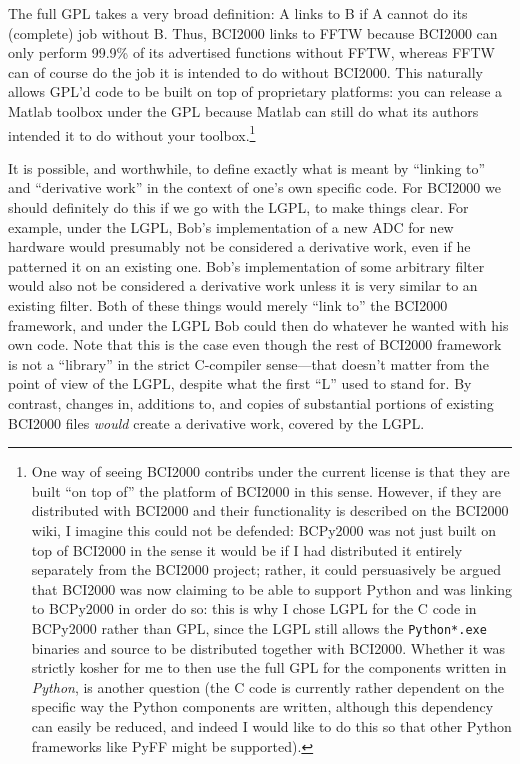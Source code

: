 \documentclass{article}
\begin{document}
The full GPL takes a very broad definition:  A links to B if A cannot do its (complete) job without B.  Thus, BCI2000 links to FFTW because BCI2000 can only perform 99.9\% of its advertised functions without FFTW, whereas FFTW can of course do the job it is intended to do without BCI2000. This naturally allows GPL'd code to be built on top of proprietary platforms: you can release a Matlab toolbox under the GPL because Matlab can still do what its authors intended it to do without your toolbox.\footnote{One way of seeing BCI2000 contribs under the current license is that they are built ``on top of'' the platform of BCI2000 in this sense. However, if they are distributed with BCI2000 and their functionality is described on the BCI2000 wiki, I imagine this could not be defended:  BCPy2000 was not just built on top of BCI2000 in the sense it would be if I had distributed it entirely separately from the BCI2000 project;  rather, it could persuasively be argued that BCI2000 was now claiming to be able to support Python and was linking to BCPy2000 in order do so:  this is why I chose LGPL for the C code in BCPy2000 rather than GPL, since the LGPL still allows the {\tt Python*.exe} binaries and source to be distributed together with BCI2000.  Whether it was strictly kosher for me to then use the full GPL for the components written in {\em Python}, is another question (the C code is currently rather dependent on the specific way the Python components are written, although this dependency can easily be reduced, and indeed I would like to do this so that other Python frameworks like PyFF might be supported).}

It is possible, and worthwhile, to define exactly what is meant by ``linking to'' and ``derivative work'' in the context of one's own specific code.  For BCI2000 we should definitely do this if we go with the LGPL, to make things clear.  For example, under the LGPL, Bob's implementation of a new ADC for new hardware would presumably not be considered a derivative work, even if he patterned it on an existing one.  Bob's implementation of some arbitrary filter would also not be considered a derivative work unless it is very similar to an existing filter.  Both of these things would merely ``link to'' the BCI2000 framework, and under the LGPL Bob could then do whatever he wanted with his own code. Note that this is the case even though the rest of BCI2000 framework is not a ``library'' in the strict C-compiler sense---that doesn't matter from the point of view of the LGPL, despite what the first ``L'' used to stand for.  By contrast, changes in, additions to, and copies of substantial portions of existing BCI2000 files {\em would} create a derivative work, covered by the LGPL.
\end{document}
